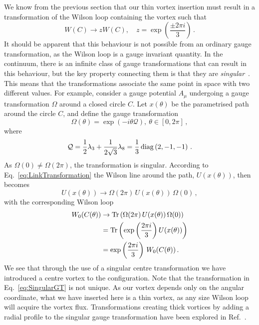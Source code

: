 We know from the previous section that our thin vortex insertion must result in a transformation of the Wilson loop containing the vortex such that
%
\begin{equation}
W(C)\rightarrow z W(C),\quad z = \exp\left(\frac{\pm2\pi i}{3}\right)\, .
\end{equation} 
%
It should be apparent that this behaviour is not possible from an ordinary gauge transformation, as the Wilson loop is a gauge invariant quantity. In the continuum, there is an infinite class of gauge transformations that can result in this behaviour, but the key property connecting them is that they are \textit{singular}~\cite{'tHooft:1977hy}. This means that the transformations associate the same point in space with two different values. For example, consider a gauge potential $A_\mu$ undergoing a gauge transformation $\Omega$ around a closed circle $C$. Let $x(\theta)$ be the parametrised path around the circle $C$, and define the gauge transformation
%
\begin{equation}
\Omega(\theta) = \exp\left(-i\theta \mathcal{Q}\right),~\theta\in [0,2\pi]\, ,
\label{eq:SingularGT}
\end{equation}
%
where
%
\begin{equation}
\mathcal{Q} = \frac{1}{2}\lambda_3 +\frac{1}{2\sqrt{3}}\lambda_8 = \frac{1}{3}\operatorname{diag}\left(2,-1,-1\right)\, .\label{eq:Q}
\end{equation}
As $\Omega(0) \neq \Omega(2\pi)$, the transformation is singular. According to Eq.~\eqref{eq:LinkTransformation} the Wilson line around the path, $U(x(\theta))$, then becomes
%
\begin{equation}
U(x(\theta)) \rightarrow \Omega(2\pi)\,U(x(\theta))\,\Omega(0)\, ,
\end{equation}
%
with the corresponding Wilson loop
%
\begin{align}
W_0(C(\theta)) &\rightarrow \operatorname{Tr}\left( \Omega(2\pi)\,U(x(\theta))\,\Omega(0)\right)\nonumber\\
&=\operatorname{Tr}\left(\exp\left(\frac{2\pi i}{3}\right)U(x(\theta))\right)\nonumber\\
&=\exp\left(\frac{2\pi i}{3}\right)\,W_0(C(\theta))\, .
\end{align}
%
We see that through the use of a singular centre transformation we have introduced a  centre vortex to the configuration. Note that the transformation in Eq.~\eqref{eq:SingularGT} is not unique. As our vortex depends only on the angular coordinate, what we have inserted here is a thin vortex, as any size Wilson loop will acquire the vortex flux. Transformations creating thick vortices by adding a radial profile to the singular gauge transformation have been explored in Ref.~\cite{Faber:1997rp}.\\

